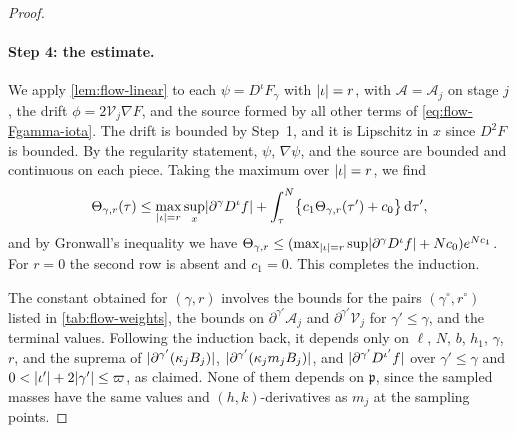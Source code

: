 \begin{proof}
\paragraph{Step 4: the estimate.} We apply \cref{lem:flow-linear} to each
$\psi=D^\iota F_\gamma$ with $\lvert \iota\rvert=r$, with $\mathcal A=\mathcal A_j$ on stage
$j$, the drift $\phi=2\mathcal V_j\nabla F$, and the source formed by all other
terms of \eqref{eq:flow-Fgamma-iota}. The drift is bounded by Step~1, and it is
Lipschitz in $x$ since $D^2F$ is bounded. By the regularity statement, $\psi$,
$\nabla\psi$, and the source are bounded and continuous on each piece. Taking the
maximum over $\lvert \iota\rvert=r$, we find
\[
 \Theta_{\gamma,r}(\tau)\le\max_{\lvert \iota\rvert=r}\sup_x\lvert \partial^\gamma D^\iota f\rvert
 +\int_\tau^N\bigl\{c_1\Theta_{\gamma,r}(\tau')+c_0\bigr\}\,\mathrm d\tau',
\]
and by Gronwall's inequality we have
$\Theta_{\gamma,r}\le(\max_{\lvert \iota\rvert=r}\sup\lvert \partial^\gamma D^\iota f\rvert+Nc_0)e^{Nc_1}$.
For $r=0$ the second row is absent and $c_1=0$. This completes the induction.

The constant obtained for $(\gamma,r)$ involves the bounds for the pairs
$(\gamma^\circ,r^\circ)$ listed in \cref{tab:flow-weights}, the bounds on
$\partial^{\gamma'}\mathcal A_j$ and $\partial^{\gamma'}\mathcal V_j$ for
$\gamma'\le\gamma$, and the terminal values. Following the induction back, it
depends only on $\ell$, $N$, $b$, $h_1$, $\gamma$, $r$, and the suprema of
$\lvert \partial^{\gamma'}(\kappa_jB_j)\rvert$, $\lvert \partial^{\gamma'}(\kappa_jm_jB_j)\rvert$, and
$\lvert \partial^{\gamma'}D^{\iota'}f\rvert$ over $\gamma'\le\gamma$ and
$0<\lvert \iota'\rvert+2\lvert \gamma'\rvert\le\varpi$, as claimed. None of them depends on
$\mathfrak p$, since the sampled masses have the same values and
$(h,k)$-derivatives as $m_j$ at the sampling points.
\end{proof}

